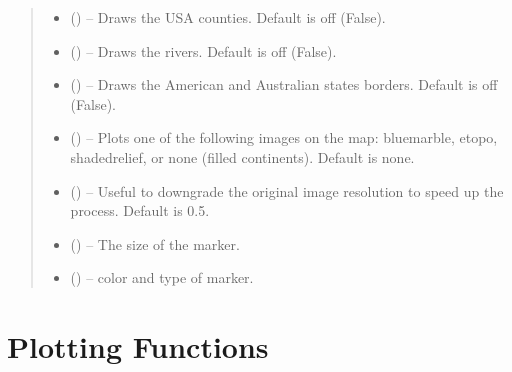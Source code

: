 \documentclass[letterpaper,10pt,english]{sphinxmanual}
\begin{document}
\begin{fulllineitems}
\begin{quote}
\begin{description}
\begin{itemize}
\item {} 
 () -- Draws the USA counties. Default is off (False).

\item {} 
 () -- Draws the rivers. Default is off (False).

\item {} 
 () -- Draws the American and Australian states borders.
Default is off (False).

\item {} 
 () -- Plots one of the following images on the map:
bluemarble, etopo, shadedrelief, or none (filled continents).
Default is none.

\item {} 
 () -- Useful to downgrade the original image resolution to
speed up the process. Default is 0.5.

\item {} 
 () -- The size of the marker.

\item {} 
 () -- color and type of marker.

\end{itemize}

\end{description}\end{quote}

\end{fulllineitems}



\chapter{Plotting Functions}
\label{\detokenize{Plot:plotting-functions}}\label{\detokenize{Plot::doc}}
\end{document}
